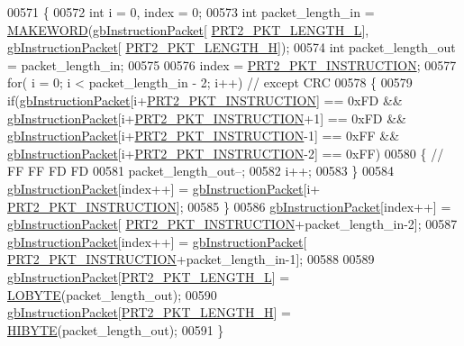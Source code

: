 \begin{DoxyCode}
00571 \{
00572     \textcolor{keywordtype}{int} i = 0, index = 0;
00573     \textcolor{keywordtype}{int} packet\_length\_in = \hyperlink{dynamixel_8h_a6b98c16b8e3e7733dd4063d0b0fac24c}{MAKEWORD}(\hyperlink{classdynamixel2_a298efe9115fdbf77019af1001e801fb4}{gbInstructionPacket}[
      \hyperlink{dynamixel_8h_a9e77ab568957b64786c810967dec8b0c}{PRT2\_PKT\_LENGTH\_L}], \hyperlink{classdynamixel2_a298efe9115fdbf77019af1001e801fb4}{gbInstructionPacket}[
      \hyperlink{dynamixel_8h_a5ea18a21d722bf72217d5408c4d2a868}{PRT2\_PKT\_LENGTH\_H}]);
00574     \textcolor{keywordtype}{int} packet\_length\_out = packet\_length\_in;
00575 
00576     index = \hyperlink{dynamixel_8h_aece9dd9d7c0fa1714d53c568865d79ad}{PRT2\_PKT\_INSTRUCTION};
00577     \textcolor{keywordflow}{for}( i = 0; i < packet\_length\_in - 2; i++)  \textcolor{comment}{// except CRC}
00578     \{
00579         \textcolor{keywordflow}{if}(\hyperlink{classdynamixel2_a298efe9115fdbf77019af1001e801fb4}{gbInstructionPacket}[i+\hyperlink{dynamixel_8h_aece9dd9d7c0fa1714d53c568865d79ad}{PRT2\_PKT\_INSTRUCTION}] == 0xFD && 
      \hyperlink{classdynamixel2_a298efe9115fdbf77019af1001e801fb4}{gbInstructionPacket}[i+\hyperlink{dynamixel_8h_aece9dd9d7c0fa1714d53c568865d79ad}{PRT2\_PKT\_INSTRUCTION}+1] == 0xFD && 
      \hyperlink{classdynamixel2_a298efe9115fdbf77019af1001e801fb4}{gbInstructionPacket}[i+\hyperlink{dynamixel_8h_aece9dd9d7c0fa1714d53c568865d79ad}{PRT2\_PKT\_INSTRUCTION}-1] == 0xFF && 
      \hyperlink{classdynamixel2_a298efe9115fdbf77019af1001e801fb4}{gbInstructionPacket}[i+\hyperlink{dynamixel_8h_aece9dd9d7c0fa1714d53c568865d79ad}{PRT2\_PKT\_INSTRUCTION}-2] == 0xFF)
00580         \{   \textcolor{comment}{// FF FF FD FD}
00581             packet\_length\_out--;
00582             i++;
00583         \}
00584         \hyperlink{classdynamixel2_a298efe9115fdbf77019af1001e801fb4}{gbInstructionPacket}[index++] = \hyperlink{classdynamixel2_a298efe9115fdbf77019af1001e801fb4}{gbInstructionPacket}[i+
      \hyperlink{dynamixel_8h_aece9dd9d7c0fa1714d53c568865d79ad}{PRT2\_PKT\_INSTRUCTION}];
00585     \}
00586     \hyperlink{classdynamixel2_a298efe9115fdbf77019af1001e801fb4}{gbInstructionPacket}[index++] = \hyperlink{classdynamixel2_a298efe9115fdbf77019af1001e801fb4}{gbInstructionPacket}[
      \hyperlink{dynamixel_8h_aece9dd9d7c0fa1714d53c568865d79ad}{PRT2\_PKT\_INSTRUCTION}+packet\_length\_in-2];
00587     \hyperlink{classdynamixel2_a298efe9115fdbf77019af1001e801fb4}{gbInstructionPacket}[index++] = \hyperlink{classdynamixel2_a298efe9115fdbf77019af1001e801fb4}{gbInstructionPacket}[
      \hyperlink{dynamixel_8h_aece9dd9d7c0fa1714d53c568865d79ad}{PRT2\_PKT\_INSTRUCTION}+packet\_length\_in-1];
00588 
00589     \hyperlink{classdynamixel2_a298efe9115fdbf77019af1001e801fb4}{gbInstructionPacket}[\hyperlink{dynamixel_8h_a9e77ab568957b64786c810967dec8b0c}{PRT2\_PKT\_LENGTH\_L}] = 
      \hyperlink{dynamixel_8h_a04c0416272e5c07bdf955d803a21688e}{LOBYTE}(packet\_length\_out);
00590     \hyperlink{classdynamixel2_a298efe9115fdbf77019af1001e801fb4}{gbInstructionPacket}[\hyperlink{dynamixel_8h_a5ea18a21d722bf72217d5408c4d2a868}{PRT2\_PKT\_LENGTH\_H}] = 
      \hyperlink{dynamixel_8h_a75c5b5f21e837e80c0feb4da9a421f87}{HIBYTE}(packet\_length\_out);
00591 \}
\end{DoxyCode}
